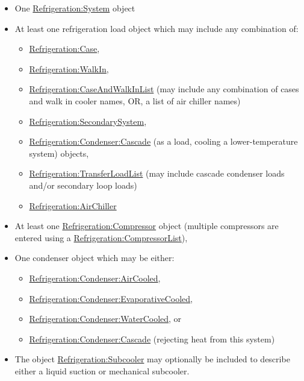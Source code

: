 \begin{itemize}
  \item  One \hyperref[refrigerationsystem]{Refrigeration:System} object
  \item  At least one refrigeration load object which may include any combination of:
  \begin{itemize}
    \item  \hyperref[refrigerationcase]{Refrigeration:Case},
    \item  \hyperref[refrigerationwalkin]{Refrigeration:WalkIn},
    \item  \hyperref[refrigerationcaseandwalkinlist]{Refrigeration:CaseAndWalkInList} (may include any combination of cases and walk in cooler names, OR, a list of air chiller names)
    \item  \hyperref[refrigerationsecondarysystem]{Refrigeration:SecondarySystem},
    \item  \hyperref[refrigerationcondensercascade]{Refrigeration:Condenser:Cascade} (as a load, cooling a lower-temperature system) objects,
    \item  \hyperref[refrigerationtransferloadlist]{Refrigeration:TransferLoadList} (may include cascade condenser loads and/or secondary loop loads)
    \item  \hyperref[refrigerationairchiller]{Refrigeration:AirChiller}
  \end{itemize}
  \item  At least one \hyperref[refrigerationcompressor]{Refrigeration:Compressor} object (multiple compressors are entered using a \hyperref[refrigerationcompressorlist]{Refrigeration:CompressorList}),
  \item  One condenser object which may be either:
  \begin{itemize}
    \item  \hyperref[refrigerationcondenseraircooled]{Refrigeration:Condenser:AirCooled},
    \item  \hyperref[refrigerationcondenserevaporativecooled]{Refrigeration:Condenser:EvaporativeCooled},
    \item  \hyperref[refrigerationcondenserwatercooled]{Refrigeration:Condenser:WaterCooled}, or
    \item  \hyperref[refrigerationcondensercascade]{Refrigeration:Condenser:Cascade} (rejecting heat from this system)
  \end{itemize}
  \item  The object \hyperref[refrigerationsubcooler]{Refrigeration:Subcooler} may optionally be included to describe either a liquid suction or mechanical subcooler.
\end{itemize}

